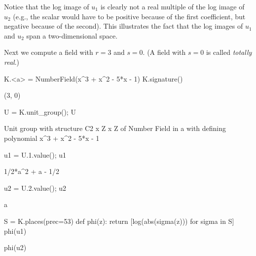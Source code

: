 Notice that the log image of $u_1$ is clearly not a real multiple of
the log image of $u_2$ (e.g., the scalar would have to be positive
because of the first coefficient, but negative because of the second).
This illustrates the fact that the log images of $u_1$ and $u_2$ span
a two-dimensional space.

Next we compute a field with $r=3$ and $s=0$.
(A field with $s=0$ is called \emph{totally real}.)
\begin{sagecode}
\begin{sagecell}
K.<a> = NumberField(x^3 + x^2 - 5*x - 1)
K.signature()
\end{sagecell}
\begin{sageout}
(3, 0)
\end{sageout}
\begin{sagecell}
U = K.unit_group(); U
\end{sagecell}
\begin{sageout}
Unit group with structure C2 x Z x Z of Number Field in a with
defining polynomial x^3 + x^2 - 5*x - 1
\end{sageout}
\begin{sagecell}
u1 = U.1.value(); u1
\end{sagecell}
\begin{sageout}
1/2*a^2 + a - 1/2
\end{sageout}
\begin{sagecell}
u2 = U.2.value(); u2
\end{sagecell}
\begin{sageout}
a
\end{sageout}
\begin{sagecell}
S = K.places(prec=53)
def phi(z):
return [log(abs(sigma(z))) for sigma in S]
phi(u1)
\end{sagecell}
\begin{sageout}
[-0.7747670223461895, -0.3928487245813982, 1.1676157469275887]
\end{sageout}
\begin{sagecell}
phi(u2)
\end{sagecell}
\begin{sageout}
[0.9966812040934553, -1.6402241503223172, 0.6435429462288627]
\end{sageout}
\end{sagecode}

